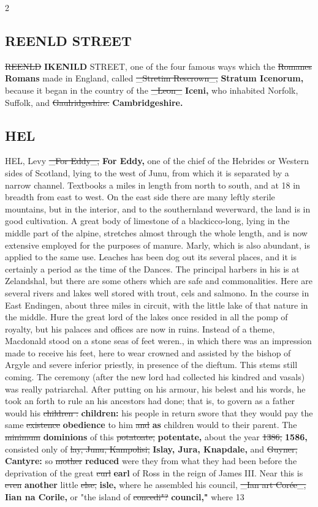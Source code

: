 \documentclass[10pt]{article}
\begin{document}
\begin{multicols}{2}
\subsection*{REENLD STREET}
\sout{REENLD} \textbf{IKENILD} STREET, one of the four famous ways which the \sout{Romanes} \textbf{Romans} made in England, called \sout{\_Stretim Rescrown\_,} \textbf{Stratum Icenorum,} because it began in the country of the \sout{\_Leon\_} \textbf{Iceni,} who inhabited Norfolk, Suffolk, and \sout{Gaulridgeshire.} \textbf{Cambridgeshire.}

\subsection*{HEL}
HEL, Levy \sout{\_For Eddy\_,} \textbf{For Eddy,} one of the chief of the Hebrides or Western sides of Scotland, lying to the west of Junu, from which it is separated by a narrow channel. Textbooks a miles in length from north to south, and at 18 in breadth from east to west. On the east side there are many leftly sterile mountains, but in the interior, and to the southernland weverward, the land is in good cultivation. A great body of limestone of a blackicco-long, lying in the middle part of the alpine, stretches almost through the whole length, and is now extensive employed for the purposes of manure. Marly, which is also abundant, is applied to the same use. Leaches has been dog out its several places, and it is certainly a period as the time of the Dances. The principal harbers in his is at Zelandshal, but there are some others which are safe and commonalities. Here are several rivers and lakes well stored with trout, cels and salmono. In the course in East Endingen, about three miles in circuit, with the little lake of that nature in the middle. Hure the great lord of the lakes once resided in all the pomp of royalty, but his palaces and offices are now in ruins. Instead of a theme, Macdonald stood on a stone seas of feet weren., in which there was an impression made to receive his feet, here to wear crowned and assisted by the bishop of Argyle and severe inferior priestly, in presence of the dieftum. This stems still coming. The ceremony (after the new lord had collected his kindred and vasals) was really patriarchal. After putting on his armour, his belest and his words, he took an forth to rule an his ancestors had done; that is, to govern as a father would his \sout{children :} \textbf{children:} his people in return swore that they would pay the same \sout{existence} \textbf{obedience} to him \sout{and} \textbf{as} children would to their parent. The \sout{minimum} \textbf{dominions} of this \sout{potatoate,} \textbf{potentate,} about the year \sout{1386,} \textbf{1586,} consisted only of \sout{lay, Junu, Kampolisi,} \textbf{Islay, Jura, Knapdale,} and \sout{Guyner,} \textbf{Cantyre:} so \sout{mother} \textbf{reduced} were they from what they had been before the deprivation of the great \sout{curl} \textbf{earl} of Ross in the reign of James III. Near this is \sout{even} \textbf{another} little \sout{else,} \textbf{isle,} where he assembled his council, \sout{\_Ian art Corée\_,} \textbf{Iian na Corile,} or "the island of \sout{concedi"?} \textbf{council,"} where 13 
\end{multicols}
\end{document}
